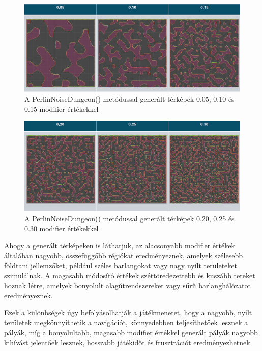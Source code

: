 \begin{figure}[ht]
\centering
\includegraphics[width=\textwidth]{images/lowmodifierperlin.png}
\caption{ A PerlinNoiseDungeon() metódussal generált térképek 0.05, 0.10 és 0.15 modifier értékekkel}
\label{fig:lowmodifyperlin}
\end{figure}

\begin{figure}[ht]
\centering
\includegraphics[width=\textwidth]{images/highmodifierperlin.png}
\caption{ A PerlinNoiseDungeon() metódussal generált térképek 0.20, 0.25 és 0.30 modifier értékekkel}
\label{fig:highmodifyperlin}
\end{figure}


Ahogy a generált térképeken is láthatjuk, az alacsonyabb modifier értékek általában nagyobb, összefüggőbb régiókat eredményeznek, amelyek szélesebb földtani jellemzőket, például széles barlangokat vagy nagy nyílt területeket szimulálnak. A magasabb módosító értékek széttöredezettebb és kuszább tereket hoznak létre, amelyek bonyolult alagútrendszereket vagy sűrű barlanghálózatot eredményeznek.

Ezek a különbségek úgy befolyásolhatják a játékmenetet, hogy a nagyobb, nyílt területek megkönnyíthetik a navigációt, könnyedebben teljesíthetőek lesznek a pályák, míg a bonyolultabb, magasabb modifier értékkel generált pályák nagyobb kihívást jelentőek lesznek, hosszabb játékidőt és frusztrációt eredményezhetnek.

